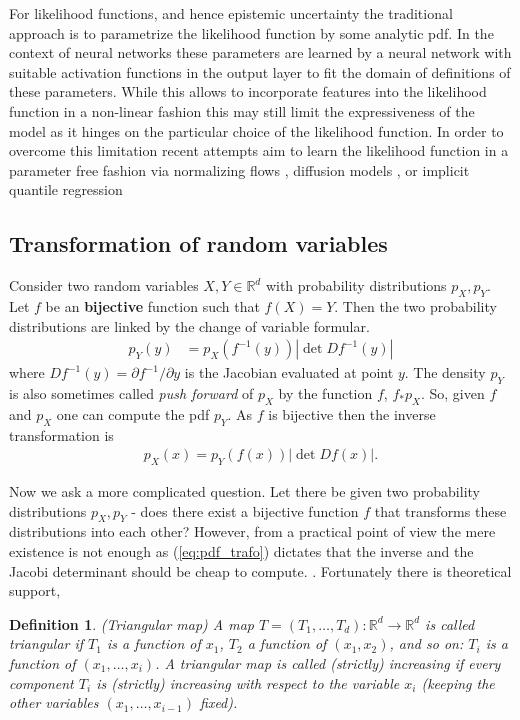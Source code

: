 \documentclass[12pt,a4paper]{article}
\newtheorem{definition}{Definition}
\begin{document}
For likelihood functions, and hence epistemic uncertainty the traditional approach is to parametrize the likelihood function by some analytic pdf. In the context of neural networks these parameters are learned by a neural network with suitable activation functions in the output layer to fit the domain of definitions of these parameters. While this allows to incorporate features into the likelihood function in a non-linear fashion this may still limit the expressiveness of the model as it hinges on the particular choice of the likelihood function. In order to overcome this limitation recent attempts aim to learn the likelihood function in a parameter free fashion via normalizing flows \cite{normalizing_flows_2019, normalizing_flow_review_kobyzev_2021}, diffusion models \cite{https://doi.org/10.48550/arxiv.2006.11239}, or implicit quantile regression \cite{pmlr-v80-dabney18a}

\subsection{Transformation of random variables}
Consider two random variables $X, Y \in \mathbb{R}^d$ with probability distributions 
$p_X, p_Y$. Let $f$ be an \textbf{bijective }function such that $f(X) = Y$. Then the two probability distributions are linked by the change of variable formular. 
\begin{align}
p_Y(y) &= p_X(f^{-1}(y)) |\det Df^{-1}(y)| \label{eq:pdf_trafo} 
\end{align}
where $Df^{-1}(y)=\partial f^{-1} / \partial y $ is the Jacobian evaluated at point $y$. The density $p_Y$ is also sometimes called \textit{push forward} of $p_X$ by the function $f$, $f_*p_X$. So, given $f$ and $p_X$  one can compute the pdf $p_Y$. As $f$ is bijective then the inverse transformation is
\begin{align}
	p_X(x) = p_Y(f(x)) |\det Df(x)|. \label{eq:pdf_trafo_inv} 
\end{align}

Now we ask a more complicated question. Let there be given  two probability distributions $p_X, p_Y$ - does there exist a bijective function $f$ that transforms these distributions into each other? However, from a practical point of view the mere existence is not enough as (\ref{eq:pdf_trafo}) dictates that the inverse and the Jacobi determinant should be cheap to compute. \cite{Bogachev_2005, jaini_polynomial_flow_2019}.
Fortunately there is theoretical support,
\begin{definition}{(Triangular map)}
	A map $T=(T_1, \dots, T_d): \mathbb{R}^d  \rightarrow \mathbb{R}^d $ is called triangular if $T_1$ is a function of $x_1$, $T_2$ a function of $(x_1, x_2)$, and so on: $T_i$ is a function of $(x_1,\dots, x_i)$. A triangular map is called (strictly) increasing if every component $T_i$ is (strictly) increasing with respect to the variable $x_i$ (keeping the other variables $(x_1, \dots, x_{i-1})$ fixed).
\end{definition}
\end{document}
